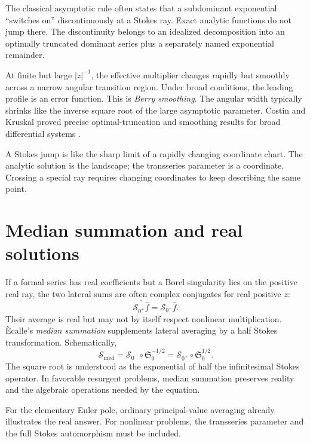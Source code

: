 \documentclass[11pt,openany]{book}
\theoremstyle{definition}
\theoremstyle{plain}
\theoremstyle{remark}
\newcommand{\trans}[1]{\widehat{#1}}
\newcommand{\Stokes}{\mathfrak{S}}
\newcommand{\median}{\mathcal{S}_{\mathrm{med}}}
\newcommand{\lateralsum}[1]{\mathcal{S}_{#1}}
\begin{document}
The classical asymptotic rule often states that a subdominant exponential ``switches on'' discontinuously at a Stokes ray. Exact analytic functions do not jump there. The discontinuity belongs to an idealized decomposition into an optimally truncated dominant series plus a separately named exponential remainder.

At finite but large $|z|^{-1}$, the effective multiplier changes rapidly but smoothly across a narrow angular transition region. Under broad conditions, the leading profile is an error function. This is \emph{Berry smoothing}. The angular width typically shrinks like the inverse square root of the large asymptotic parameter. Costin and Kruskal proved precise optimal-truncation and smoothing results for broad differential systems \cite{costin-kruskal}.

\begin{intuitionbox}
A Stokes jump is like the sharp limit of a rapidly changing coordinate chart. The analytic solution is the landscape; the transseries parameter is a coordinate. Crossing a special ray requires changing coordinates to keep describing the same point.
\end{intuitionbox}

\section{Median summation and real solutions}

If a formal series has real coefficients but a Borel singularity lies on the positive real ray, the two lateral sums are often complex conjugates for real positive $z$:
\[
 \overline{\lateralsum{0^+}\trans f}
 =\lateralsum{0^-}\trans f.
\]
Their average is real but may not by itself respect nonlinear multiplication. \`Ecalle's \emph{median summation} supplements lateral averaging by a half Stokes transformation. Schematically,
\begin{equation}\label{eq:median-schematic}
 \median
 =\lateralsum{0^-}\circ\Stokes_0^{-1/2}
 =\lateralsum{0^+}\circ\Stokes_0^{1/2}.
\end{equation}
The square root is understood as the exponential of half the infinitesimal Stokes operator. In favorable resurgent problems, median summation preserves reality and the algebraic operations needed by the equation.

For the elementary Euler pole, ordinary principal-value averaging already illustrates the real answer. For nonlinear problems, the transseries parameter and the full Stokes automorphism must be included.
\end{document}
